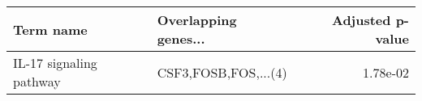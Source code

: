 \begin{tabular}{llr}
\toprule
              Term name & Overlapping genes... &  Adjusted p-value \\
\midrule
IL-17 signaling pathway & CSF3,FOSB,FOS,...(4) &          1.78e-02 \\
\bottomrule
\end{tabular}

